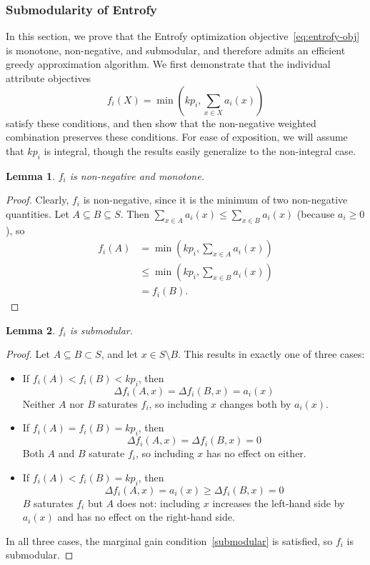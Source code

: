 \documentclass[12pt]{article}
\newtheorem{lemma}{Lemma}
\begin{document}
\subsubsection*{Submodularity of Entrofy\label{app:submodular}}
In this section, we prove that the Entrofy optimization objective~\eqref{eq:entrofy-obj} is monotone, non-negative, and submodular, and therefore admits an efficient greedy approximation algorithm.
We first demonstrate that the individual attribute objectives \[f_i(X) = \min\left(k p_i, \sum_{x \in X}a_i(x)\right)\] satisfy these conditions, and then show that the non-negative weighted combination preserves these conditions.
For ease of exposition, we will assume that $kp_i$ is integral, though the results easily generalize to the non-integral case.
\begin{lemma}
    $f_i$ is non-negative and monotone.\label{lem:monotone}
\end{lemma}
\begin{proof}
    Clearly, $f_i$ is non-negative, since it is the minimum of two non-negative quantities.
    Let $A \subseteq B \subseteq S$.
    Then $\sum_{x \in A} a_i(x) \leq \sum_{x \in B} a_i(x)$ (because $a_i \geq 0$), so
    \begin{align*}
    f_i(A) &= \min\left( k p_i, \sum_{x \in A}a_i(x)\right)\\
           &\leq \min\left(k p_i, \sum_{x \in B}a_i(x)\right)\\
           &= f_i(B).
    \end{align*}
\end{proof}

\begin{lemma}
    $f_i$ is submodular.\label{lem:submod}
\end{lemma}
\begin{proof}
Let $A \subseteq B \subset S$, and let $x \in S \setminus B$.  This results in exactly one of three cases:
\begin{itemize}
\item If $f_i(A) < f_i(B) < kp_i$, then
$$
\Delta f_i(A, x) = \Delta f_i(B, x) = a_i(x)
$$
Neither $A$ nor $B$ saturates $f_i$, so including $x$ changes both by $a_i(x)$.
\item If $f_i(A) = f_i(B) = kp_i$, then 
$$
\Delta f_i(A, x) = \Delta f_i(B, x) = 0
$$
Both $A$ and $B$ saturate $f_i$, so including $x$ has no effect on either.
\item If $f_i(A) < f_i(B) = kp_i$, then 
$$
\Delta f_i(A, x) = a_i(x) \geq \Delta f_i(B, x) = 0
$$
$B$ saturates $f_i$ but $A$ does not: including $x$ increases the left-hand side by $a_i(x)$ and has no effect on the right-hand side.
\end{itemize}
In all three cases, the marginal gain condition~\eqref{submodular} is satisfied, so $f_i$ is submodular.
\end{proof}
\end{document}
